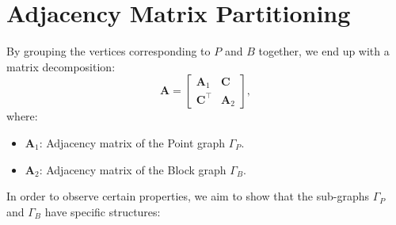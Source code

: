 \documentclass{article}
\begin{document}
\section{Adjacency Matrix Partitioning}
By grouping the vertices corresponding to $P$ and $B$ together, we end up with a matrix decomposition:
\[
\mathbf{A} =
\begin{bmatrix}
\mathbf{A}_1 & \mathbf{C} \\
\mathbf{C}^\top & \mathbf{A}_2
\end{bmatrix},
\]
where:
\begin{itemize}
    \item \( \mathbf{A}_1 \): Adjacency matrix of the Point graph \(\Gamma_P\).
    \item \( \mathbf{A}_2 \): Adjacency matrix of the Block graph \(\Gamma_B\).
\end{itemize} 
In order to observe certain properties, we aim to show that the sub-graphs \(\Gamma_P\) and \(\Gamma_B\) have specific structures:
\end{document}

